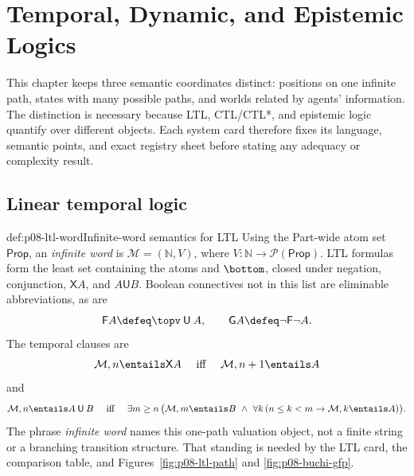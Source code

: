 \chapter{Temporal, Dynamic, and Epistemic Logics}
\label{sec:p08-temporal-dynamic-epistemic}

This chapter keeps three semantic coordinates distinct: positions on one
infinite path, states with many possible paths, and worlds related by agents'
information.  The distinction is necessary because LTL, CTL/CTL*, and
epistemic logic quantify over different objects.  Each system card therefore
fixes its language, semantic points, and exact registry sheet before stating
any adequacy or complexity result.

\section{Linear temporal logic}

\begin{hbdefinition}{def:p08-ltl-word}{Infinite-word semantics for LTL}
Using the Part-wide atom set \(\mathsf{Prop}\), an \emph{infinite word}
is \(\mathcal M=(\mathbb N,V)\), where
\(V:\mathbb N\to\mathcal P(\mathsf{Prop})\).  LTL formulas form the least set
containing the atoms and \(\bottom\), closed under negation, conjunction,
\(\mathsf X A\), and \(A\mathbin{\mathsf U}B\).  Boolean connectives not in
this list are eliminable abbreviations, as are
\[
 \mathsf F A\defeq\topv\mathbin{\mathsf U}A,
 \qquad
 \mathsf G A\defeq\neg\mathsf F\neg A.
\]
The temporal clauses are
\[
 \mathcal M,n\entails\mathsf X A
 \quad\text{ iff }\quad
 \mathcal M,n+1\entails A
\]
and
\[
 \mathcal M,n\entails A\mathbin{\mathsf U}B
 \quad\text{ iff }\quad
 \exists m\ge n\,
 \bigl(\mathcal M,m\entails B\ \land\
       \forall k\,(n\le k<m\to\mathcal M,k\entails A)\bigr).
\]
The phrase \emph{infinite word} names this one-path valuation object, not a
finite string or a branching transition structure.  That standing is needed
by the LTL card, the comparison table, and Figures~\ref{fig:p08-ltl-path} and
\ref{fig:p08-buchi-gfp}.
\end{hbdefinition}

